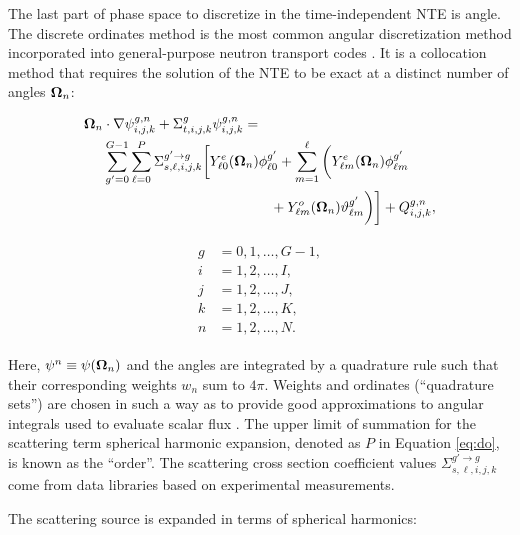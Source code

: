 The last part of phase space to discretize in the time-independent NTE is angle.
The discrete ordinates method is the most common angular discretization method
incorporated into general-purpose neutron transport codes \cite{lm}. It is a 
collocation method that requires the solution of the NTE to be exact at a 
distinct number of angles $\mathbf\Omega_n$:

\noindent\begin{minipage}{0.69\textwidth}
\begin{align*}
\mathbf\Omega_n&\cdot\nabla\psi^{g,n}_{i,j,k}+\Sigma_{t,i,j,k}^g\psi^{g,n}_{i,j,k} = \\
&\sum_{g'=0}^{G-1}\sum_{\ell=0}^P \Sigma_{s,\ell,i,j,k}^{g'\rightarrow g}
\bigg[Y^e_{\ell 0}(\mathbf\Omega_n)\phi_{\ell 0}^{g'} + \sum_{m=1}^{\ell}
\bigg(Y^e_{\ell m}(\mathbf\Omega_n)\phi_{\ell m}^{g'} \\
&\qquad\qquad\qquad\qquad\qquad\qquad
 + Y^o_{\ell m}(\mathbf\Omega_n)\vartheta_{\ell m}^{g'}\bigg)\bigg]
 + Q^{g,n}_{i,j,k},
\end{align*}
\end{minipage}
\hspace{-0.55cm}
\begin{minipage}{0.31\textwidth}
\begin{align}
\begin{split}
g &= 0,1,\ldots,G-1,\\
i &= 1,2,\ldots,I,\\
j &= 1,2,\ldots,J,\\
k &= 1,2,\ldots,K,\\
n &= 1,2,\ldots,N.
\label{eq:do}
\end{split}
\end{align}
\end{minipage}
\vspace{0.1cm}

\noindent Here, $\psi^n \equiv \psi(\mathbf\Omega_n)$ and the angles are integrated by a
quadrature rule such that their corresponding weights $w_n$ sum to $4\pi$. Weights and
ordinates (``quadrature sets'') are chosen in such a way as to provide good 
approximations to angular integrals used to evaluate scalar flux \cite{lm,exmm}. The 
upper limit of summation for the scattering term spherical harmonic expansion, denoted
as $P$ in Equation \ref{eq:do}, is known as the ``\pn order''. The scattering cross section
coefficient values $\Sigma_{s,\ell,i,j,k}^{g'\rightarrow g}$ come from data libraries based on
experimental measurements.

The scattering source is expanded in terms of spherical harmonics:


